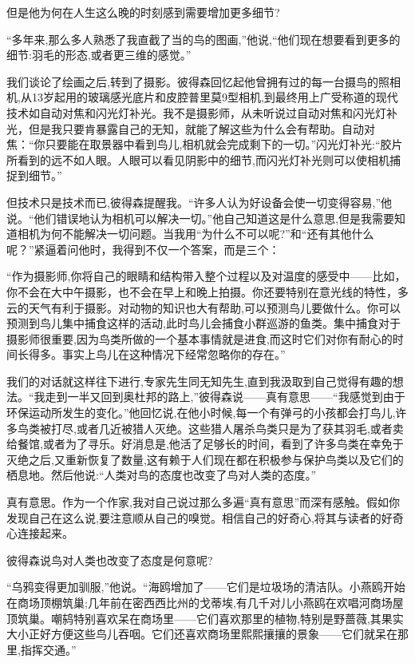但是他为何在人生这么晚的时刻感到需要增加更多细节?

“多年来,那么多人熟悉了我直截了当的鸟的图画,”他说,“他们现在想要看到更多的细节:羽毛的形态,或者更三维的感觉。”

我们谈论了绘画之后,转到了摄影。彼得森回忆起他曾拥有过的每一台摄鸟的照相机,从13岁起用的玻璃感光底片和皮腔普里莫9型相机,到最终用上广受称道的现代技术如自动对焦和闪光灯补光。我不是摄影师，从未听说过自动对焦和闪光灯补光，但是我只要肯暴露自己的无知，就能了解这些为什么会有帮助。自动对焦：“你只要能在取景器中看到鸟儿,相机就会完成剩下的一切。”闪光灯补光:“胶片所看到的远不如人眼。人眼可以看见阴影中的细节,而闪光灯补光则可以使相机捕捉到细节。”

但技术只是技术而已,彼得森提醒我。“许多人认为好设备会使一切变得容易,”他说。“他们错误地认为相机可以解决一切。”他自己知道这是什么意思,但是我需要知道相机为何不能解决一切问题。当我用“为什么不可以呢?”和“还有其他什么呢？”紧逼着问他时，我得到不仅一个答案，而是三个：

“作为摄影师,你将自己的眼睛和结构带入整个过程以及对温度的感受中——比如，你不会在大中午摄影，也不会在早上和晚上拍摄。你还要特别在意光线的特性，多云的天气有利于摄影。对动物的知识也大有帮助,可以预测鸟儿要做什么。你可以预测到鸟儿集中捕食这样的活动,此时鸟儿会捕食小群巡游的鱼类。集中捕食对于摄影师很重要,因为鸟类所做的一个基本事情就是进食,而这时它们对你有耐心的时间长得多。事实上鸟儿在这种情况下经常忽略你的存在。”

我们的对话就这样往下进行,专家先生同无知先生,直到我汲取到自己觉得有趣的想法。“我走到一半又回到奥杜邦的路上,”彼得森说——真有意思——“我感觉到由于环保运动所发生的变化。”他回忆说,在他小时候,每一个有弹弓的小孩都会打鸟儿,许多鸟类被打尽,或者几近被猎人灭绝。这些猎人屠杀鸟类只是为了获其羽毛,或者卖给餐馆,或者为了寻乐。好消息是,他活了足够长的时间，看到了许多鸟类在幸免于灭绝之后,又重新恢复了数量,这有赖于人们现在都在积极参与保护鸟类以及它们的栖息地。然后他说:“人类对鸟的态度也改变了鸟对人类的态度。”

真有意思。作为一个作家,我对自己说过那么多遍“真有意思”而深有感触。假如你发现自己在这么说,要注意顺从自己的嗅觉。相信自己的好奇心,将其与读者的好奇心连接起来。

彼得森说鸟对人类也改变了态度是何意呢?

“乌鸦变得更加驯服,”他说。“海鸥增加了——它们是垃圾场的清洁队。小燕鸥开始在商场顶棚筑巢;几年前在密西西比州的戈蒂埃,有几千对儿小燕鸥在欢唱河商场屋顶筑巢。嘲鸫特别喜欢呆在商场里——它们喜欢那里的植物,特别是野蔷薇,其果实大小正好方便这些鸟儿吞咽。它们还喜欢商场里熙熙攘攘的景象——它们就呆在那里,指挥交通。”

